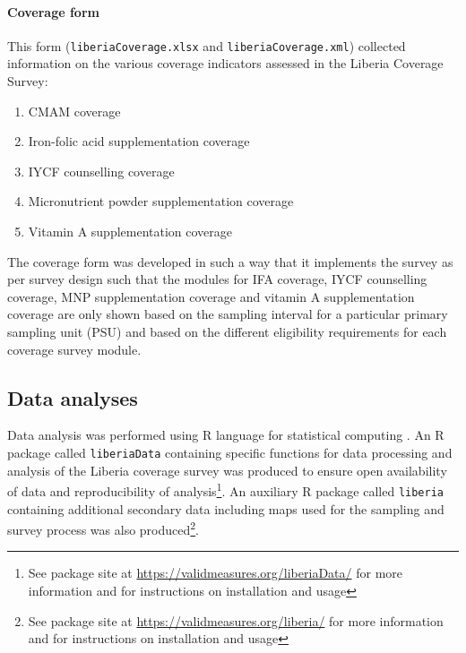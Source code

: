 \documentclass[12pt,a4paper]{article}
\let\oldparagraph\paragraph
\renewcommand{\paragraph}[1]{\oldparagraph{#1}\mbox{}}
\begin{document}
\hypertarget{coverage-form}{%
\paragraph{Coverage form}\label{coverage-form}}

This form (\texttt{liberiaCoverage.xlsx} and \texttt{liberiaCoverage.xml}) collected information on the various coverage indicators assessed in the Liberia Coverage Survey:

\begin{enumerate}
\def\labelenumi{\arabic{enumi}.}
\item
  CMAM coverage
\item
  Iron-folic acid supplementation coverage
\item
  IYCF counselling coverage
\item
  Micronutrient powder supplementation coverage
\item
  Vitamin A supplementation coverage
\end{enumerate}

The coverage form was developed in such a way that it implements the survey as per survey design such that the modules for IFA coverage, IYCF counselling coverage, MNP supplementation coverage and vitamin A supplementation coverage are only shown based on the sampling interval for a particular primary sampling unit (PSU) and based on the different eligibility requirements for each coverage survey module.

\hypertarget{data-analyses}{%
\subsection{Data analyses}\label{data-analyses}}

Data analysis was performed using R language for statistical computing \citep{R:2019rr}. An R package called \texttt{liberiaData} containing specific functions for data processing and analysis of the Liberia coverage survey was produced to ensure open availability of data and reproducibility of analysis\footnote{See package site at \url{https://validmeasures.org/liberiaData/} for more information and for instructions on installation and usage}. An auxiliary R package called \texttt{liberia} containing additional secondary data including maps used for the sampling and survey process was also produced\footnote{See package site at \url{https://validmeasures.org/liberia/} for more information and for instructions on installation and usage}.
\end{document}
